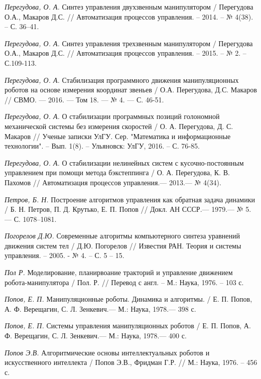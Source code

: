 \begin{thebibliography}{10}
	{\it Перегудова, О. А.} Синтез управления двухзвенным манипулятором / Перегудова О.А., Макаров Д.С. // Автоматизация процессов управления. – 		2014. – № 4(38). – С. 36–41.
	
	{\it Перегудова, О. А.} Синтез управления трехзвенным манипулятором / Перегудова О.А., Макаров Д.С. // Автоматизация процессов управления. – 		2015. – № 2. – С.109-113.

	{\it Перегудова, О. А.} Стабилизация программного движения манипуляционных роботов на основе измерения координат звеньев / О.А. Перегудова, Д.С. 	Макаров // СВМО. — 2016. — Том 18. — № 4. — С. 46-51.
	
	{\it Перегудова, О. А.} О стабилизации программных позиций голономной механической системы без измерения скоростей /  О. А. Перегудова, Д. С. Макаров // Ученые записки УлГУ. Сер. "Математика и информационные технологии". -- Вып. 1(8). -- Ульяновск: УлГУ, 2016. -- С. 76-85.

	{\it Перегудова, О. А.} О стабилизации нелинейных систем с кусочно-постоянным управлением при помощи метода бэкстеппинга / О. А. Перегудова, К. 	В. Пахомов // Автоматизация процессов управления.—  2013.— № 4(34).

	{\it Петров, Б. Н.} Построение алгоритмов управления как обратная задача динамики / Б. Н. Петров, П. Д. Крутько, Е. П. Попов // Докл. АН СССР.— 	1979.— № 5.— С. 1078–1081.
	
	{\it Погорелов Д.Ю.} Современные алгоритмы компьютерного синтеза уравнений движения систем тел / Д.Ю. Погорелов // Известия РАН. Теория и 		системы управления. – 2005. - № 4. – С. 5 – 15.
	
	{\it Пол Р.} Моделирование, планирвоание тракторий и управление движением робота-манипулятора / Пол. Р. // Перевод с англ. – М.: Наука, 1976. – 103 с.
	
	{\it Попов, Е. П.} Манипуляционные роботы. Динамика и алгоритмы. / Е. П. Попов, А. Ф. Верещагин,
	С. Л. Зенкевич.— М.: Наука, 1978.— 398 с.

	{\it Попов, Е. П.} Системы управления манипуляционных роботов / Е. П. Попов, А. Ф. Верещагин,
	С. Л. Зенкевич.— М.: Наука, 1978.— 400 с.
	
	{\it Попов Э.В.} Алгоритмические основы интеллектуальных роботов и искусственного интеллекта / Попов Э.В., Фридман Г.Р. // М.: Наука, 	1976. – 	456 с.
	

\end{thebibliography}
